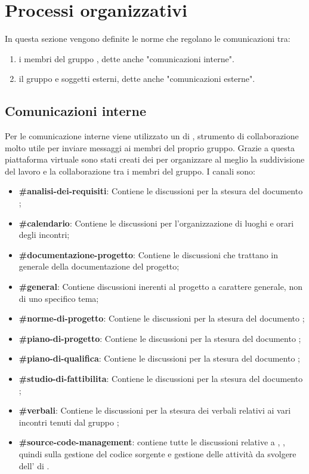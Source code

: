 \section{Processi organizzativi}
In questa sezione vengono definite le norme che regolano le comunicazioni tra:
\begin{enumerate}
	\item i membri del gruppo \Gruppo{}, dette anche "comunicazioni interne".
	\item il gruppo e soggetti esterni, dette anche "comunicazioni esterne".
\end{enumerate}
	
\subsection{Comunicazioni interne}
Per le comunicazione interne viene utilizzato un  di , strumento di collaborazione molto utile per inviare messaggi ai membri del proprio gruppo.
Grazie a questa piattaforma virtuale sono stati creati dei  per organizzare al meglio la suddivisione del lavoro e la collaborazione tra i membri del gruppo.
I canali sono:
\begin{itemize}
	\item \textbf{\#analisi-dei-requisiti}: Contiene le discussioni per la stesura del documento \AdR{};
	\item \textbf{\#calendario}: Contiene le discussioni per l’organizzazione di luoghi e orari degli incontri;
	\item \textbf{\#documentazione-progetto}: Contiene le discussioni che trattano in generale della documentazione del progetto;
	\item \textbf{\#general}: Contiene discussioni inerenti al progetto a carattere generale, non di uno specifico tema;
	\item \textbf{\#norme-di-progetto}: Contiene le discussioni per la stesura del documento \NdP{};
    \item \textbf{\#piano-di-progetto}: Contiene le discussioni per la stesura del documento \PdP{};
	\item \textbf{\#piano-di-qualifica}: Contiene le discussioni per la stesura del documento \PdQ{};
	\item \textbf{\#studio-di-fattibilita}: Contiene le discussioni per la stesura del documento \SdF{};
	\item \textbf{\#verbali}: Contiene le discussioni per la stesura dei verbali relativi ai vari incontri tenuti dal gruppo \Gruppo{};
	\item \textbf{\#source-code-management}: contiene tutte le discussioni relative a , , quindi sulla gestione del codice sorgente e gestione delle attività da svolgere dell' di .
\end{itemize}

